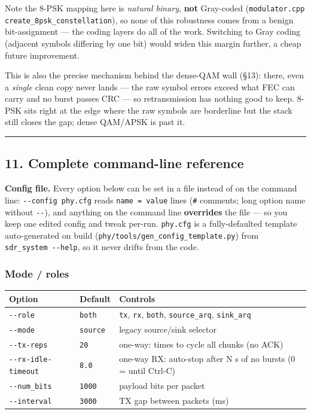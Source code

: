 \documentclass[
  10pt,
]{article}
\begin{document}
Note the 8-PSK mapping here is \emph{natural binary}, \textbf{not}
Gray-coded (\texttt{modulator.cpp}
\texttt{create\_8psk\_constellation}), so none of this robustness comes
from a benign bit-assignment --- the coding layers do all of the work.
Switching to Gray coding (adjacent symbols differing by one bit) would
widen this margin further, a cheap future improvement.

This is also the precise mechanism behind the dense-QAM wall (§13):
there, even a \emph{single} clean copy never lands --- the raw symbol
errors exceed what FEC can carry and no burst passes CRC --- so
retransmission has nothing good to keep. 8-PSK sits right at the edge
where the raw symbols are borderline but the stack still closes the gap;
dense QAM/APSK is past it.

\begin{center}\rule{0.5\linewidth}{0.5pt}\end{center}

\hypertarget{11-complete-command-line-reference}{%
\subsection{11. Complete command-line
reference}\label{11-complete-command-line-reference}}

\textbf{Config file.} Every option below can be set in a file instead of
on the command line: \texttt{-\/-config\ phy.cfg} reads
\texttt{name\ =\ value} lines (\texttt{\#} comments; long option name
without \texttt{-\/-}), and anything on the command line
\textbf{overrides} the file --- so you keep one edited config and tweak
per-run. \texttt{phy.cfg} is a fully-defaulted template auto-generated
on build (\texttt{phy/tools/gen\_config\_template.py}) from
\texttt{sdr\_system\ -\/-help}, so it never drifts from the code.

\hypertarget{mode--roles}{%
\subsubsection{Mode / roles}\label{mode--roles}}

\begin{longtable}[]{@{}lll@{}}
\toprule
Option & Default & Controls \\
\midrule
\endhead
\texttt{-\/-role} & \texttt{both} & \texttt{tx}, \texttt{rx},
\texttt{both}, \texttt{source\_arq}, \texttt{sink\_arq} \\
\texttt{-\/-mode} & \texttt{source} & legacy source/sink selector \\
\texttt{-\/-tx-reps} & \texttt{20} & one-way: times to cycle all chunks
(no ACK) \\
\texttt{-\/-rx-idle-timeout} & \texttt{8.0} & one-way RX: auto-stop
after N s of no bursts (0 = until Ctrl-C) \\
\texttt{-\/-num\_bits} & \texttt{1000} & payload bits per packet \\
\texttt{-\/-interval} & \texttt{3000} & TX gap between packets (ms) \\
\bottomrule
\end{longtable}
\end{document}
